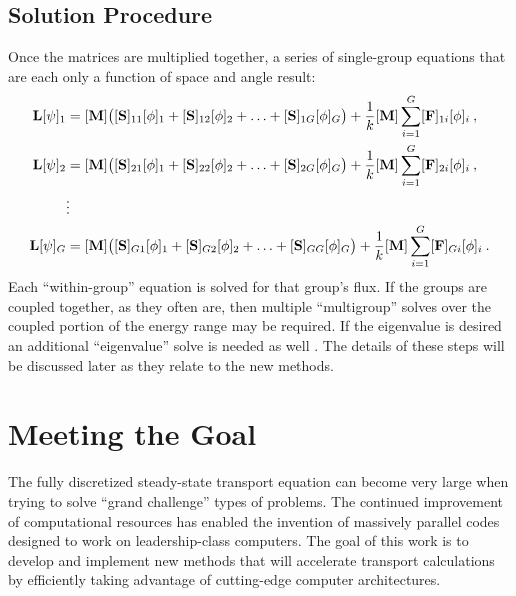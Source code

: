 \subsection{Solution Procedure}
Once the matrices are multiplied together, a series of single-group equations that are each only a function of space and angle result:
%
\begin{equation}
  \begin{aligned}
    \mathbf{L}[\psi]_1 &= [\mathbf{M}]\bigl([\mathbf{S}]_{11}[\phi]_1 + 
    [\mathbf{S}]_{12}[\phi]_2 + \ldots + [\mathbf{S}]_{1G}[\phi]_G\bigr) + 
    \frac{1}{k}[\mathbf{M}]\sum_{i=1}^{G}[\mathbf{F}]_{1i}[\phi]_{i} \:, \\
    \mathbf{L}[\psi]_2 &= [\mathbf{M}]\bigl([\mathbf{S}]_{21}[\phi]_1 + 
    [\mathbf{S}]_{22}[\phi]_2 + \ldots + [\mathbf{S}]_{2G}[\phi]_G\bigr) + 
     \frac{1}{k}[\mathbf{M}]\sum_{i=1}^{G}[\mathbf{F}]_{2i}[\phi]_{i} \:, \\
    &\vdots\\
    \mathbf{L}[\psi]_G &= [\mathbf{M}]\bigl([\mathbf{S}]_{G1}[\phi]_1 + 
    [\mathbf{S}]_{G2}[\phi]_2 + \ldots + [\mathbf{S}]_{GG}[\phi]_G\bigr) + 
     \frac{1}{k}[\mathbf{M}]\sum_{i=1}^{G}[\mathbf{F}]_{Gi}[\phi]_{i} \:.
  \end{aligned}
  \label{eq:group-equations}
\end{equation}
%
Each ``within-group'' equation is solved for that group's flux. If the groups are coupled together, as they often are, then multiple ``multigroup'' solves over the coupled portion of the energy range may be required. If the eigenvalue is desired an additional ``eigenvalue'' solve is needed as well \cite{Evans2009}. The details of these steps will be discussed later as they relate to the new methods.  


\section{Meeting the Goal}
The fully discretized steady-state transport equation can become very large when trying to solve ``grand challenge'' types of problems. The continued improvement of computational resources has enabled the invention of massively parallel codes designed to work on leadership-class computers. The goal of this work is to develop and implement new methods that will accelerate transport calculations by efficiently taking advantage of cutting-edge computer architectures. 

